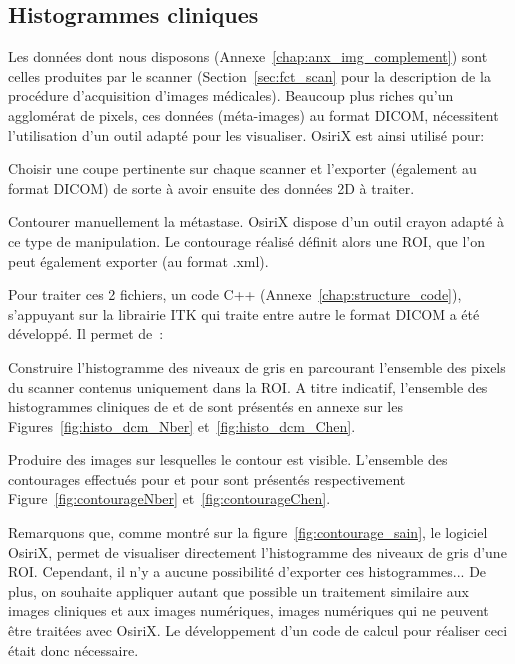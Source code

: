 \documentclass[main.tex]{subfiles}
\begin{document}
\subsection{Histogrammes cliniques} 
Les données dont nous disposons (\cf Annexe~\ref{chap:anx_img_complement}) sont celles produites par le scanner (\cf Section~\ref{sec:fct_scan} pour la description de la procédure d'acquisition d'images médicales). Beaucoup plus riches qu'un agglomérat de pixels, ces données (méta-images) au format DICOM, nécessitent l'utilisation d'un outil adapté pour les visualiser. OsiriX est ainsi utilisé pour:
\begin{myitemize}
\item Choisir une coupe pertinente sur chaque scanner et l'exporter (également au format DICOM) de sorte à avoir ensuite des données 2D à traiter.
\item Contourer manuellement la métastase. OsiriX dispose d'un outil crayon adapté à ce type de manipulation. Le contourage réalisé définit alors une ROI, que l'on peut également exporter (au format .xml).
\end{myitemize}
Pour traiter ces 2 fichiers, un code C++ (\cf Annexe~\ref{chap:structure_code}), s'appuyant sur la librairie ITK qui traite entre autre le format DICOM a été développé. Il permet de~:
\begin{myitemize}
\item Construire l'histogramme des niveaux de gris en parcourant  l'ensemble des pixels du scanner contenus uniquement dans la ROI. 
A titre indicatif, l'ensemble des histogrammes cliniques de \Nber et de \Chen sont présentés en annexe sur les Figures~\ref{fig:histo_dcm_Nber} et~\ref{fig:histo_dcm_Chen}. %
\item Produire des images sur lesquelles le contour est visible. L'ensemble des contourages effectués pour \Nber et pour \Chen sont présentés respectivement Figure~\ref{fig:contourageNber} et~\ref{fig:contourageChen}.
\end{myitemize}


Remarquons que, comme montré sur la figure~\ref{fig:contourage_sain}, le logiciel OsiriX, permet de visualiser directement l'histogramme des niveaux de gris d'une ROI. Cependant, il n'y a aucune possibilité d'exporter ces histogrammes... De plus, on souhaite appliquer autant que possible un traitement similaire aux images cliniques et aux images numériques, images numériques qui ne peuvent être traitées avec OsiriX. Le développement d'un code de calcul pour réaliser ceci était donc nécessaire.
\end{document}
